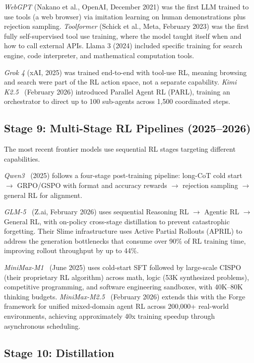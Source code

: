 \documentclass[12pt]{article}
\begin{document}
\textit{WebGPT} (Nakano et al., OpenAI, December 2021) was the first LLM trained to use tools (a web browser) via imitation learning on human demonstrations plus rejection sampling. \textit{Toolformer} (Schick et al., Meta, February 2023) was the first fully self-supervised tool use training, where the model taught itself when and how to call external APIs. Llama 3 (2024) included specific training for search engine, code interpreter, and mathematical computation tools.

\textit{Grok 4} (xAI, 2025) was trained end-to-end with tool-use RL, meaning browsing and search were part of the RL action space, not a separate capability. \textit{Kimi K2.5}~\cite{Kimi2025Researcher} (February 2026) introduced Parallel Agent RL (PARL), training an orchestrator to direct up to 100 sub-agents across 1,500 coordinated steps.

\subsection{Stage 9: Multi-Stage RL Pipelines (2025--2026)}

The most recent frontier models use sequential RL stages targeting different capabilities.

\textit{Qwen3}~\cite{Qwen2025Qwen3} (2025) follows a four-stage post-training pipeline: long-CoT cold start $\rightarrow$ GRPO/GSPO with format and accuracy rewards $\rightarrow$ rejection sampling $\rightarrow$ general RL for alignment.

\textit{GLM-5}~\cite{GLM2025GLM5} (Z.ai, February 2026) uses sequential Reasoning RL $\rightarrow$ Agentic RL $\rightarrow$ General RL, with on-policy cross-stage distillation to prevent catastrophic forgetting. Their Slime infrastructure uses Active Partial Rollouts (APRIL) to address the generation bottlenecks that consume over 90\% of RL training time, improving rollout throughput by up to 44\%.

\textit{MiniMax-M1}~\cite{MiniMax2025M1} (June 2025) uses cold-start SFT followed by large-scale CISPO (their proprietary RL algorithm) across math, logic (53K synthesized problems), competitive programming, and software engineering sandboxes, with 40K--80K thinking budgets. \textit{MiniMax-M2.5}~\cite{MiniMax2025Forge} (February 2026) extends this with the Forge framework for unified mixed-domain agent RL across 200,000+ real-world environments, achieving approximately 40x training speedup through asynchronous scheduling.

\subsection{Stage 10: Distillation}
\end{document}
